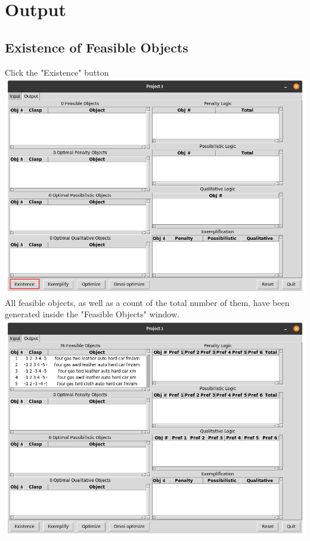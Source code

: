 \documentclass[12pt]{report}
\begin{document}
\newpage

\chapter{Output}
\section{Existence of Feasible Objects} Click the "Existence" button\\
\includegraphics[scale=0.3]{existence}\\
All feasible objects, as well as a count of the total number of them, have been generated inside the "Feasible Objects" window.\\
\includegraphics[scale=0.3]{post_existence}
\newpage
\end{document}
